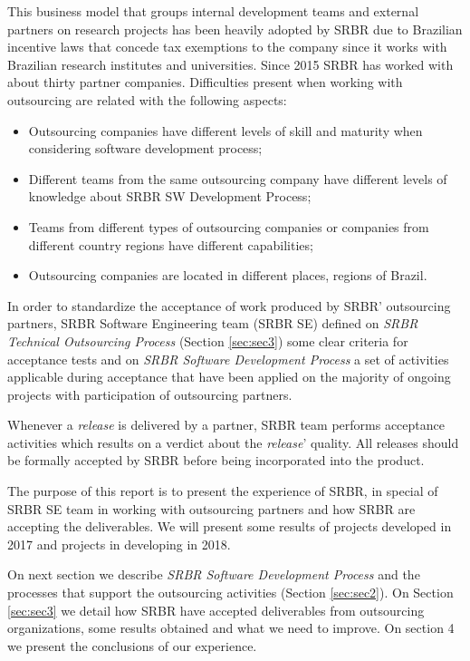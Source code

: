 This business model that groups internal development teams and external partners on research projects has been heavily adopted by SRBR due to Brazilian incentive laws that concede tax exemptions to the company since it works with Brazilian research institutes and universities. 
Since 2015 SRBR has worked with about thirty partner companies. Difficulties present when working with outsourcing are related with the following aspects:
\begin{itemize}
\item Outsourcing companies have different levels of skill and maturity when considering software development process;
\item Different teams from the same outsourcing company have different levels of knowledge about SRBR SW Development Process; \cite{Costa18}
\item Teams from different types of outsourcing companies or companies from different country regions have different capabilities;
\item Outsourcing companies are located in different places, regions of Brazil.
\end{itemize}

In order to standardize the acceptance of work produced by SRBR' outsourcing partners, SRBR Software Engineering team (SRBR SE) defined on \textit{SRBR Technical Outsourcing Process} (Section \ref{sec:sec3}) some clear criteria for acceptance tests and on \textit{SRBR Software Development Process} a set of activities applicable during acceptance that have been applied on the majority of ongoing projects with participation of outsourcing partners.

Whenever a \textit{release} is delivered by a partner, SRBR team performs acceptance activities which results on a verdict about the \textit{release}' quality. All releases should be formally accepted by SRBR before being incorporated into the product.

The purpose of this report is to present the experience of SRBR, in special of SRBR SE team in working with outsourcing partners and how SRBR are accepting the deliverables. We will present some results of projects developed in 2017 and projects in developing in 2018.

On next section we describe \textit{SRBR Software Development Process} and the processes that support the outsourcing activities (Section \ref{sec:sec2}). On Section \ref{sec:sec3} we detail how SRBR  have accepted deliverables from outsourcing organizations, some results obtained and what we need to improve. On section 4 we present the conclusions of our experience.

